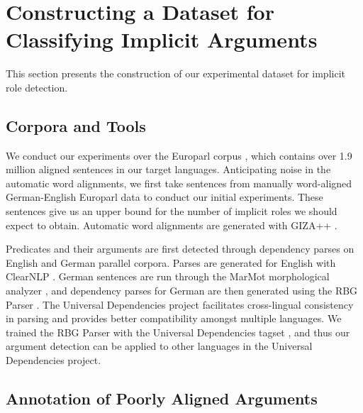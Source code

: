 \documentclass[11pt]{article}
\begin{document}
\section{Constructing a Dataset for Classifying Implicit Arguments}

This section presents the construction of our experimental dataset for  implicit role detection.

\subsection{Corpora and Tools}
We conduct our experiments over the Europarl corpus \cite{koehn2005europarl}, which contains over 1.9 million aligned sentences in our target languages. %
Anticipating noise in the automatic word alignments, we first take sentences from manually word-aligned German-English Europarl data \cite{pado05cross} to conduct our initial experiments. These sentences give us an upper bound for the number of implicit roles we should expect to obtain. Automatic word alignments are generated with GIZA++ \cite{och03:asc}.%

Predicates and their arguments are first detected through dependency parses on English and German parallel corpora. Parses are generated for English with ClearNLP \cite{choi2013transition}. German sentences are run through the MarMot morphological analyzer \cite{muller2013efficient}, and dependency parses for German are then generated using the RBG Parser \cite{lei2014low}. The Universal Dependencies project facilitates cross-lingual consistency in parsing and provides better compatibility amongst multiple languages. We trained the RBG Parser with the Universal Dependencies tagset \cite{rosa2014hamledt}, and thus our argument detection can be applied to other languages in the Universal Dependencies project.

\subsection{Annotation of Poorly Aligned Arguments}
\end{document}
